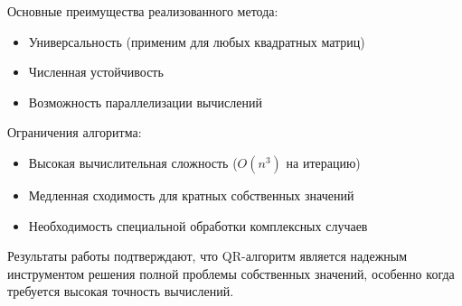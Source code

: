 Основные преимущества реализованного метода:
\begin{itemize}
\item Универсальность (применим для любых квадратных матриц)
\item Численная устойчивость
\item Возможность параллелизации вычислений
\end{itemize}

Ограничения алгоритма:
\begin{itemize}
\item Высокая вычислительная сложность ($O(n^3)$ на итерацию)
\item Медленная сходимость для кратных собственных значений
\item Необходимость специальной обработки комплексных случаев
\end{itemize}

Результаты работы подтверждают, что QR-алгоритм является надежным инструментом решения полной проблемы 
собственных значений, особенно когда требуется высокая точность вычислений. 
